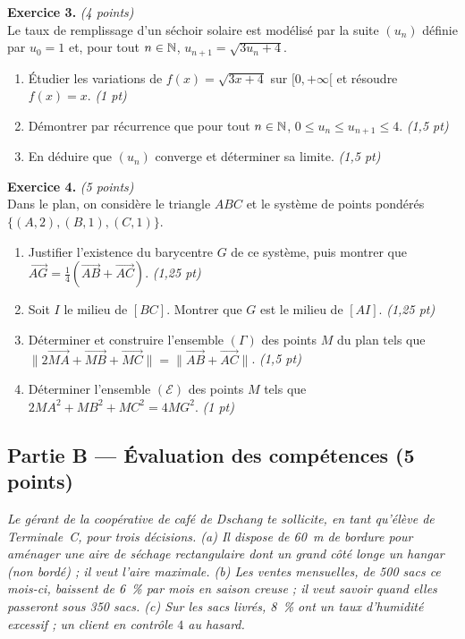 \smallskip
\noindent\textbf{Exercice 3.} \hfill\textit{(4 points)}\\
Le taux de remplissage d'un séchoir solaire est modélisé par la suite $(u_n)$ définie par
$u_0=1$ et, pour tout $n\in\mathbb{N}$, $u_{n+1}=\sqrt{3u_n+4}$.
\begin{enumerate}[label=\arabic*)]
\item Étudier les variations de $f(x)=\sqrt{3x+4}$ sur $[0,+\infty[$ et résoudre $f(x)=x$. \hfill\textit{(1 pt)}
\item Démontrer par récurrence que pour tout $n\in\mathbb{N}$, $0\le u_n\le u_{n+1}\le4$. \hfill\textit{(1,5 pt)}
\item En déduire que $(u_n)$ converge et déterminer sa limite. \hfill\textit{(1,5 pt)}
\end{enumerate}

\smallskip
\noindent\textbf{Exercice 4.} \hfill\textit{(5 points)}\\
Dans le plan, on considère le triangle $ABC$ et le système de points pondérés
$\{(A,2),(B,1),(C,1)\}$.
\begin{enumerate}[label=\arabic*)]
\item Justifier l'existence du barycentre $G$ de ce système, puis montrer que $\overrightarrow{AG}=\frac14(\overrightarrow{AB}+\overrightarrow{AC})$. \hfill\textit{(1,25 pt)}
\item Soit $I$ le milieu de $[BC]$. Montrer que $G$ est le milieu de $[AI]$. \hfill\textit{(1,25 pt)}
\item Déterminer et construire l'ensemble $(\Gamma)$ des points $M$ du plan tels que
$\big\|2\overrightarrow{MA}+\overrightarrow{MB}+\overrightarrow{MC}\big\|=\big\|\overrightarrow{AB}+\overrightarrow{AC}\big\|$. \hfill\textit{(1,5 pt)}
\item Déterminer l'ensemble $(\mathcal E)$ des points $M$ tels que $2MA^2+MB^2+MC^2=4MG^2$. \hfill\textit{(1 pt)}
\end{enumerate}

\subsection*{Partie B — Évaluation des compétences \hfill (5 points)}

\noindent\textit{Le gérant de la coopérative de café de Dschang te sollicite, en tant qu'élève de
Terminale~C, pour trois décisions. (a) Il dispose de \SI{60}{\metre} de bordure pour aménager
une aire de séchage rectangulaire dont un grand côté longe un hangar (non bordé) ; il veut
l'aire maximale. (b) Les ventes mensuelles, de \SI{500}{} sacs ce mois-ci, baissent de
\SI{6}{\percent} par mois en saison creuse ; il veut savoir quand elles passeront sous
\SI{350}{} sacs. (c) Sur les sacs livrés, \SI{8}{\percent} ont un taux d'humidité excessif ;
un client en contrôle $4$ au hasard.}

